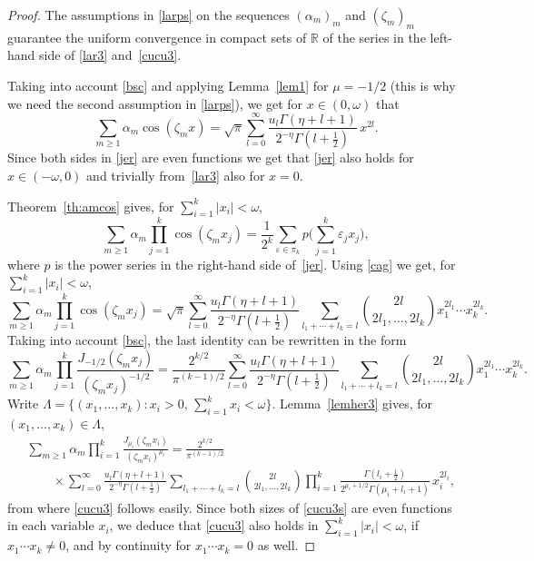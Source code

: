 \documentclass[12pt,leqno]{amsart}
\numberwithin{equation}{section}
\theoremstyle{plain}
\newcommand{\RR}{\mathbb{R}}
\newcommand{\eps}{\varepsilon}
\begin{document}
\begin{proof}
The assumptions in \eqref{larps} on the sequences $(\alpha_m)_m$ and $(\zeta_m)_m$ guarantee the uniform convergence in compact sets of $\RR$ of the series in the left-hand side of \eqref{lar3} and~\eqref{cucu3}.

Taking into account \eqref{bsc} and applying Lemma~\ref{lem1} for $\mu=-1/2$ (this is why we need the second assumption in \eqref{larps}), we get
for $x\in (0,\omega)$ that
\begin{equation}
\label{jer}
\sum_{m\ge 1}\alpha_m \cos (\zeta_mx)= \sqrt \pi \sum_{l=0}^{\infty}
\frac{u_l \Gamma(\eta+l + 1)}
   {2^{- \eta} \Gamma(l+\frac{1}{2})}\, x^{2l}.
\end{equation}
Since both sides in \eqref{jer} are even functions we get that \eqref{jer} also holds for $x\in(-\omega,0)$ and trivially from~\eqref{lar3} also for $x=0$.

Theorem~\ref{th:amcos} gives, for $\sum_{i=1}^k |x_i| <\omega$,
\begin{equation*}
\sum_{m\ge 1}\alpha_m \prod_{j=1}^k\cos (\zeta_m x_j) 
= \frac{1}{2^k} \sum_{\eps \in \pi_k} p \Big( \sum_{j=1}^k\eps_jx_j\Big),
\end{equation*}
where $p$ is the power series in the right-hand side of~\eqref{jer}. Using \eqref{cag} we get, for $ \sum_{i=1}^k |x_i| <\omega$,
\begin{equation*}
\sum_{m\ge 1}\alpha_m \prod_{j=1}^k\cos (\zeta_mx_j)=\sqrt \pi \sum_{l=0}^{\infty}
\frac{u_l \Gamma(\eta +l+ 1)}{2^{- \eta} \Gamma(l+\frac{1}{2})}
\sum_{l_1+\cdots+l_k=l}
\binom{2l}{2l_1,\ldots,2l_k}x_1^{2l_1}\cdots x_k^{2l_k}.
\end{equation*}
Taking into account \eqref{bsc}, the last identity can be rewritten in the form
\begin{equation*}
\sum_{m\ge 1} \alpha_m \prod_{j=1}^k\frac{J_{-1/2} (\zeta_mx_j)}{(\zeta_mx_j)^{-1/2}}=\frac{2^{k/2}}{\pi^{(k-1)/2}} \sum_{l=0}^{\infty}
\frac{u_l \Gamma(\eta +l+ 1)}{2^{- \eta} \Gamma(l+\frac{1}{2})}
\sum_{l_1+\cdots+l_k=l}
\binom{2l}{2l_1,\ldots,2l_k}x_1^{2l_1}\cdots x_k^{2l_k}.
\end{equation*}
Write $\Lambda=\{(x_1,\dots, x_k) : x_i>0,\, \sum_{i=1}^kx_i<\omega\}$. Lemma~\ref{lemher3} gives, for $(x_1,\dots,x_k)\in \Lambda$,
\begin{align}
\label{cucu3s}
& \sum_{m\ge 1} \alpha_m
\prod_{i=1}^k \frac{J_{\mu_i}(\zeta_mx_i)}{(\zeta_mx_i)^{\mu_i}}
= \frac{2^{k/2}}{\pi^{(k-1)/2}} \\
\nonumber
&\qquad \times \sum_{l=0}^{\infty}
\frac{u_l \Gamma(\eta +l+ 1)}{2^{- \eta} \Gamma(l+\frac{1}{2})}
\sum_{l_1+\cdots+l_k=l}
\binom{2l}{2l_1,\ldots,2l_k} \prod_{i=1}^k \frac{\Gamma(l_i+\frac{1}{2})}
   {2^{\mu_i +1/2} \Gamma(\mu_i + l_i+1)}\, x_i^{2l_i},
\end{align}
from where \eqref{cucu3} follows easily. Since both sizes of \eqref{cucu3s} are even functions in each variable $x_i$, we deduce that \eqref{cucu3} also holds in $ \sum_{i=1}^k |x_i| <\omega$, if $x_1\cdots x_k\not =0$, and by continuity
for $x_1\cdots x_k =0$ as well.
\end{proof}
\end{document}
